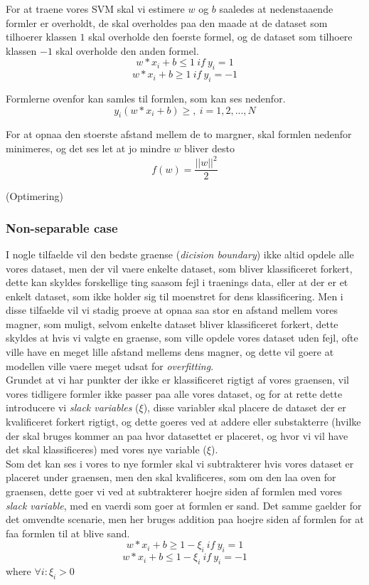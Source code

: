 \documentclass{article}
\begin{document}
For at traene vores SVM skal vi estimere $w$ og $b$ saaledes at nedenstaaende formler er overholdt, de skal overholdes paa den maade at de dataset som tilhoerer klassen $1$ skal overholde den foerste formel, og de dataset som tilhoere klassen $-1$ skal overholde den anden formel. \\
$$w * x_i + b \leq 1 \ if \ y_i = 1$$
$$w * x_i + b \geq 1 \ if \ y_i = -1$$

Formlerne ovenfor kan samles til formlen, som kan ses nedenfor. \\
$$y_i(w * x_i + b) \geq, \ i =1,2,...,N$$

For at opnaa den stoerste afstand mellem de to margner, skal formlen nedenfor minimeres, og det ses let at jo mindre $w$ bliver desto  \\
$$f(w)=\frac{||w||^2}{2}$$

(Optimering)

\subsubsection{Non-separable case}
I nogle tilfaelde vil den bedste graense (\textit{dicision boundary}) ikke altid opdele alle vores dataset, men der vil vaere enkelte dataset, som bliver klassificeret forkert, dette kan skyldes forskellige ting saasom fejl i traenings data, eller at der er et enkelt dataset, som ikke holder sig til moenstret for dens klassificering. Men i disse tilfaelde vil vi stadig proeve at opnaa saa stor en afstand mellem vores magner, som muligt, selvom enkelte dataset bliver klassificeret forkert, dette skyldes at hvis vi valgte en graense, som ville opdele vores dataset uden fejl, ofte ville have en meget lille afstand mellems dens magner, og dette vil goere at modellen ville vaere meget udsat for \textit{overfitting}. \\

Grundet at vi har punkter der ikke er klassificeret rigtigt af vores graensen, vil vores tidligere formler ikke passer paa alle vores dataset, og for at rette dette introducere vi \textit{slack variables} ($\xi$), disse variabler skal placere de dataset der er kvalificeret forkert rigtigt, og dette goeres ved at addere eller substakterre (hvilke der skal bruges kommer an paa hvor datasettet er placeret, og hvor vi vil have det skal klassificeres) med vores nye variable ($\xi$). \\

 Som det kan ses i vores to nye formler skal vi subtrakterer hvis vores dataset er placeret under graensen, men den skal kvalificeres, som om den laa oven for graensen, dette goer vi ved at subtrakterer hoejre siden af formlen med vores \textit{slack variable}, med en vaerdi som goer at formlen er sand. Det samme gaelder for det omvendte scenarie, men her bruges addition paa hoejre siden af formlen for at faa formlen til at blive sand.  \\
$$w * x_i + b \geq 1 - \xi_i \ if \ y_i = 1$$
$$w * x_i + b \leq 1 - \xi_i \ if \ y_i = -1$$
where $\forall i : \xi_i > 0$
\end{document}
